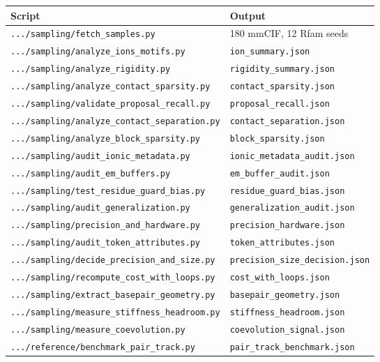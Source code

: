 \documentclass[11pt,a4paper]{article}
\begin{document}
\begin{table}[h]
\centering
\small
\begin{tabular}{@{}ll@{}}
\toprule
\textbf{Script} & \textbf{Output} \\
\midrule
\texttt{.../sampling/fetch\_samples.py} & 180 mmCIF, 12 Rfam seeds \\
\texttt{.../sampling/analyze\_ions\_motifs.py} & \texttt{ion\_summary.json} \\
\texttt{.../sampling/analyze\_rigidity.py} & \texttt{rigidity\_summary.json} \\
\texttt{.../sampling/analyze\_contact\_sparsity.py} & \texttt{contact\_sparsity.json} \\
\texttt{.../sampling/validate\_proposal\_recall.py} & \texttt{proposal\_recall.json} \\
\texttt{.../sampling/analyze\_contact\_separation.py} & \texttt{contact\_separation.json} \\
\texttt{.../sampling/analyze\_block\_sparsity.py} & \texttt{block\_sparsity.json} \\
\texttt{.../sampling/audit\_ionic\_metadata.py} & \texttt{ionic\_metadata\_audit.json} \\
\texttt{.../sampling/audit\_em\_buffers.py} & \texttt{em\_buffer\_audit.json} \\
\texttt{.../sampling/test\_residue\_guard\_bias.py} & \texttt{residue\_guard\_bias.json} \\
\texttt{.../sampling/audit\_generalization.py} & \texttt{generalization\_audit.json} \\
\texttt{.../sampling/precision\_and\_hardware.py} & \texttt{precision\_hardware.json} \\
\texttt{.../sampling/audit\_token\_attributes.py} & \texttt{token\_attributes.json} \\
\texttt{.../sampling/decide\_precision\_and\_size.py} & \texttt{precision\_size\_decision.json} \\
\texttt{.../sampling/recompute\_cost\_with\_loops.py} & \texttt{cost\_with\_loops.json} \\
\texttt{.../sampling/extract\_basepair\_geometry.py} & \texttt{basepair\_geometry.json} \\
\texttt{.../sampling/measure\_stiffness\_headroom.py} & \texttt{stiffness\_headroom.json} \\
\texttt{.../sampling/measure\_coevolution.py} & \texttt{coevolution\_signal.json} \\
\texttt{.../reference/benchmark\_pair\_track.py} & \texttt{pair\_track\_benchmark.json} \\

\end{tabular}
\end{table}
\end{document}
